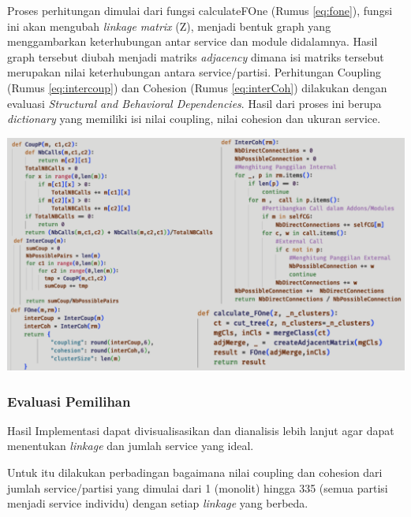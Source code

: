 Proses perhitungan dimulai dari fungsi calculateFOne (Rumus \ref{eq:fone}), fungsi ini akan mengubah \textit{linkage} \textit{matrix} (Z), menjadi bentuk graph yang menggambarkan keterhubungan antar service dan module didalamnya. Hasil graph tersebut diubah menjadi matriks \textit{adjacency} dimana isi matriks tersebut merupakan nilai keterhubungan antara service/partisi. Perhitungan Coupling (Rumus \ref{eq:intercoup}) dan Cohesion (Rumus \ref{eq:interCoh}) dilakukan dengan evaluasi \textit{Structural and Behavioral Dependencies}. 
Hasil dari proses ini berupa \textit{dictionary} yang memiliki isi nilai coupling, nilai cohesion dan ukuran service.

\begin{center}
	\includegraphics[width=14cm]{img/bab_4/coding_evaluasi.png}
	\label{fig:coding_evaluasi}
\end{center}


\subsubsection{Evaluasi Pemilihan}
Hasil Implementasi dapat divisualisasikan dan dianalisis lebih lanjut agar dapat menentukan \textit{linkage} dan jumlah service yang ideal. 

Untuk itu dilakukan perbadingan bagaimana nilai coupling dan cohesion dari jumlah service/partisi yang dimulai dari 1 (monolit) hingga 335 (semua partisi menjadi service individu) dengan setiap \textit{linkage} yang berbeda.

